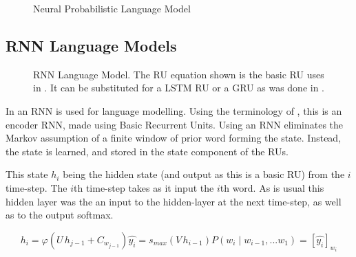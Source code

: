 \documentclass[parskip]{komatufte}
\begin{document}
\begin{figure}
	\caption{\label{fig:neural-language-model} Neural Probabilistic Language Model}
	\centering
	 
\end{figure}


\subsection{RNN Language Models}
\begin{figure}
	\caption{\label{fig:neural-language-model} RNN Language Model. The RU equation shown is the basic RU uses in \textcite{mikolov2010recurrent}.
	It can be substituted for a LSTM RU or a GRU as was done in \textcite{sundermeyer2012lstm,jozefowicz2015empirical}.
	}
	\centering
	\resizebox{\textwidth}{!}{}
\end{figure}


In  an RNN is used for language modelling.
Using the terminology of , this is an encoder RNN, made using Basic Recurrent Units.
Using an RNN eliminates the Markov assumption of a finite window of prior word forming the state.
Instead, the state is learned, and stored in the state component of the RUs. 


This state $h_{i}$ being the hidden state  (and output as this is a basic RU) from the $i$ time-step.
The $i$th time-step takes as it input the $i$th word.
As is usual this hidden layer was the an input to the hidden-layer at the next time-step, as well as to the output softmax.

\begin{equation}
	h_{i} = \varphi\left( U\,h_{j-1} + C_{w_{j-1}} \right)
	\hat{y_i} = s_{max}\left(V \, h_{i-1} \right)
	P(w_i \mid w_{i-1}, ... w_{1}) = \left[ \hat{y_i} \right]_{w_i}
\end{equation}
\end{document}
